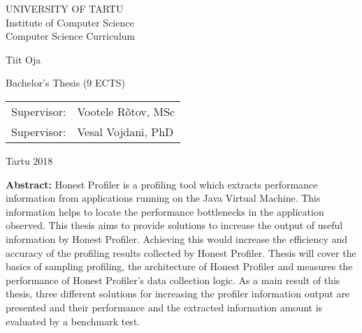 \documentclass{style/thesis}
\begin{document}
\thispagestyle{empty}
\begin{center}

\large
UNIVERSITY OF TARTU\\[2mm]
Institute of Computer Science\\
Computer Science Curriculum\\[2mm]

\vspace{25mm}

\Large Tiit Oja

\vspace{4mm}

\huge \articleName

\vspace{20mm}

\Large Bachelor's Thesis (9 ECTS)

\end{center}

\vspace{2mm}

\begin{flushright}
 {
 \setlength{\extrarowheight}{5pt}
 \begin{tabular}{r l} 
  \sffamily Supervisor: & \sffamily Vootele Rõtov, MSc \\
  \sffamily Supervisor: & \sffamily Vesal Vojdani, PhD
 \end{tabular}
 }
\end{flushright}

\vfill
\centerline{Tartu 2018}


\pagebreak
{}%

\pagebreak

\noindent\textbf{\large \articleName}
\vspace*{0mm}

\textbf{Abstract:} Honest Profiler is a profiling tool which extracts performance information from applications running on the Java Virtual Machine. This information helps to locate the performance bottlenecks in the application observed. This thesis aims to provide solutions to increase the output of useful information by Honest Profiler. Achieving this would increase the efficiency and accuracy of the profiling results collected by Honest Profiler. Thesis will cover the basics of sampling profiling, the architecture of Honest Profiler and measures the performance of Honest Profiler's data collection logic. As a main result of this thesis, three different solutions for increasing the profiler information output are presented and their performance and the extracted information amount is evaluated by a benchmark test.
  
\end{document}
